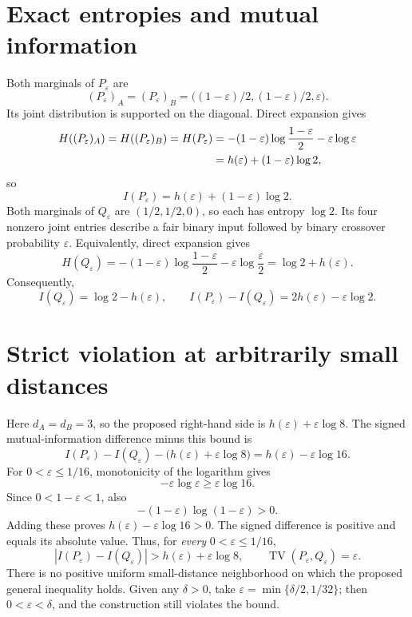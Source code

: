\documentclass[11pt,a4paper]{article}
\newcommand{\eps}{\varepsilon}
\newcommand{\TV}{\operatorname{TV}}
\begin{document}
\section{Exact entropies and mutual information}
Both marginals of $P_\eps$ are
\begin{equation}
(P_\eps)_A=(P_\eps)_B=\big((1-\eps)/2,(1-\eps)/2,\eps\big).
\end{equation}
Its joint distribution is supported on the diagonal. Direct expansion gives
\begin{align}
H((P_\eps)_A)=H((P_\eps)_B)=H(P_\eps)
&=-(1-\eps)\log\frac{1-\eps}{2}-\eps\log\eps\notag\\
&=h(\eps)+(1-\eps)\log2,
\end{align}
so
\begin{equation}
I(P_\eps)=h(\eps)+(1-\eps)\log2.
\end{equation}
Both marginals of $Q_\eps$ are $(1/2,1/2,0)$, so each has entropy $\log2$. Its four nonzero joint entries describe a fair binary input followed by binary crossover probability $\eps$. Equivalently, direct expansion gives
\begin{equation}
H(Q_\eps)=-(1-\eps)\log\frac{1-\eps}{2}-\eps\log\frac{\eps}{2}
=\log2+h(\eps).
\end{equation}
Consequently,
\begin{equation}
I(Q_\eps)=\log2-h(\eps),\qquad
I(P_\eps)-I(Q_\eps)=2h(\eps)-\eps\log2.
\end{equation}

\section{Strict violation at arbitrarily small distances}
Here $d_A=d_B=3$, so the proposed right-hand side is $h(\eps)+\eps\log8$. The signed mutual-information difference minus this bound is
\begin{equation}
I(P_\eps)-I(Q_\eps)-\big(h(\eps)+\eps\log8\big)=h(\eps)-\eps\log16.
\end{equation}
For $0<\eps\le1/16$, monotonicity of the logarithm gives
\begin{equation}
-\eps\log\eps\ge\eps\log16.
\end{equation}
Since $0<1-\eps<1$, also
\begin{equation}
-(1-\eps)\log(1-\eps)>0.
\end{equation}
Adding these proves $h(\eps)-\eps\log16>0$. The signed difference is positive and equals its absolute value. Thus, for \emph{every} $0<\eps\le1/16$,
\begin{equation}
\boxed{\left|I(P_\eps)-I(Q_\eps)\right|>h(\eps)+\eps\log8},\qquad
\TV(P_\eps,Q_\eps)=\eps.
\end{equation}
There is no positive uniform small-distance neighborhood on which the proposed general inequality holds. Given any $\delta>0$, take $\eps=\min\{\delta/2,1/32\}$; then $0<\eps<\delta$, and the construction still violates the bound.
\end{document}
